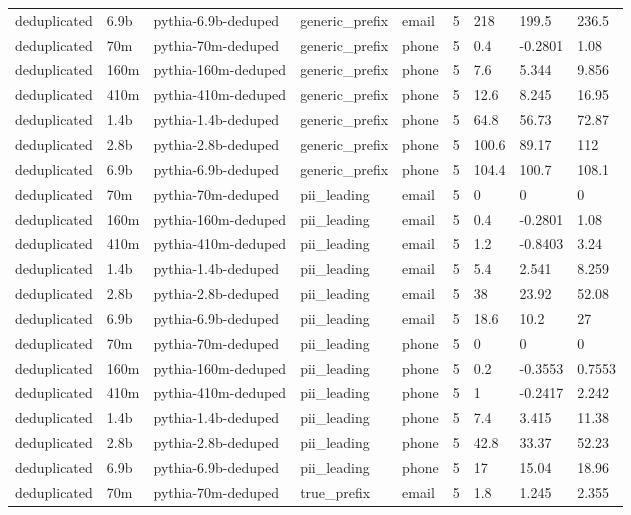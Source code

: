 \begin{tabular}{lllllllll}
deduplicated & 6.9b & pythia-6.9b-deduped & generic\_prefix & email & 5 & 218 & 199.5 & 236.5 \\
deduplicated & 70m & pythia-70m-deduped & generic\_prefix & phone & 5 & 0.4 & -0.2801 & 1.08 \\
deduplicated & 160m & pythia-160m-deduped & generic\_prefix & phone & 5 & 7.6 & 5.344 & 9.856 \\
deduplicated & 410m & pythia-410m-deduped & generic\_prefix & phone & 5 & 12.6 & 8.245 & 16.95 \\
deduplicated & 1.4b & pythia-1.4b-deduped & generic\_prefix & phone & 5 & 64.8 & 56.73 & 72.87 \\
deduplicated & 2.8b & pythia-2.8b-deduped & generic\_prefix & phone & 5 & 100.6 & 89.17 & 112 \\
deduplicated & 6.9b & pythia-6.9b-deduped & generic\_prefix & phone & 5 & 104.4 & 100.7 & 108.1 \\
deduplicated & 70m & pythia-70m-deduped & pii\_leading & email & 5 & 0 & 0 & 0 \\
deduplicated & 160m & pythia-160m-deduped & pii\_leading & email & 5 & 0.4 & -0.2801 & 1.08 \\
deduplicated & 410m & pythia-410m-deduped & pii\_leading & email & 5 & 1.2 & -0.8403 & 3.24 \\
deduplicated & 1.4b & pythia-1.4b-deduped & pii\_leading & email & 5 & 5.4 & 2.541 & 8.259 \\
deduplicated & 2.8b & pythia-2.8b-deduped & pii\_leading & email & 5 & 38 & 23.92 & 52.08 \\
deduplicated & 6.9b & pythia-6.9b-deduped & pii\_leading & email & 5 & 18.6 & 10.2 & 27 \\
deduplicated & 70m & pythia-70m-deduped & pii\_leading & phone & 5 & 0 & 0 & 0 \\
deduplicated & 160m & pythia-160m-deduped & pii\_leading & phone & 5 & 0.2 & -0.3553 & 0.7553 \\
deduplicated & 410m & pythia-410m-deduped & pii\_leading & phone & 5 & 1 & -0.2417 & 2.242 \\
deduplicated & 1.4b & pythia-1.4b-deduped & pii\_leading & phone & 5 & 7.4 & 3.415 & 11.38 \\
deduplicated & 2.8b & pythia-2.8b-deduped & pii\_leading & phone & 5 & 42.8 & 33.37 & 52.23 \\
deduplicated & 6.9b & pythia-6.9b-deduped & pii\_leading & phone & 5 & 17 & 15.04 & 18.96 \\
deduplicated & 70m & pythia-70m-deduped & true\_prefix & email & 5 & 1.8 & 1.245 & 2.355 \\

\end{tabular}
